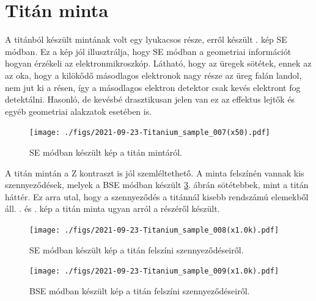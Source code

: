 \documentclass[pdftex,12pt,a4paper]{article}
\begin{document}
	\section{Titán minta}
		A titánból készült mintának volt egy lyukacsos része, erről készült . kép SE módban. Ez a kép jól illusztrálja, hogy SE módban a geometriai információt hogyan érzékeli az elektronmikroszkóp. Látható, hogy az üregek sötétek, ennek az az oka, hogy a kilökődő másodlagos elektronok nagy része az üreg falán landol, nem jut ki a résen, így a másodlagos elektron detektor csak kevés elektront fog detektálni. Hasonló, de kevésbé drasztikusan jelen van ez az effektus lejtők és egyéb geometriai alakzatok esetében is. 
		\begin{figure}[H]
			\centering
			\texttt{[image: ./figs/2021-09-23-Titanium\_sample\_007(x50).pdf]}
			\caption{SE módban készült kép a titán mintáról.}
			\label{Tiholes}
		\end{figure}
		A titán mintán a Z kontraszt is jól szemléltethető. A minta felszínén vannak kis szennyeződések, melyek a BSE módban készült \ref{tibse}. ábrán sötétebbek, mint a titán háttér. Ez arra utal, hogy a szennyeződés a titánnál kisebb rendszámú elemekből áll. . és . kép a titán minta ugyan arról a részéről készült.
		\begin{figure}[H]
			\centering
			\texttt{[image: ./figs/2021-09-23-Titanium\_sample\_008(x1.0k).pdf]}
			\caption{SE módban készült kép a titán felszíni szennyeződéseiről.}
			\label{tise}
		\end{figure}
		\begin{figure}[H]
			\centering
			\texttt{[image: ./figs/2021-09-23-Titanium\_sample\_009(x1.0k).pdf]}
			\caption{BSE módban készült kép a titán felszíni szennyeződéseiről.}
			\label{tibse}
		\end{figure}
\end{document}
